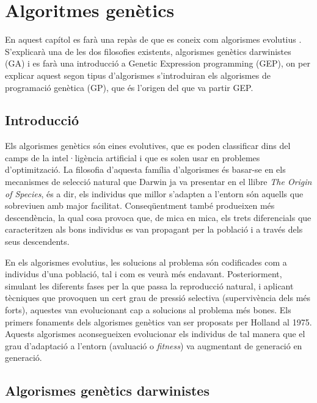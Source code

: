 %

\chapter{Algoritmes genètics}
\label{cha:AG}

En aquest capítol es farà una repàs de que es coneix com algorismes evolutius
\cite{H75}. S'explicarà una de les dos filosofies existents,
algorismes genètics darwinistes (GA) i es farà una introducció a Genetic
Expression programming (GEP), on per explicar aquest segon tipus d'algorismes
s'introduiran els algorismes de programació genètica (GP), que és l'origen del
que va partir GEP.

\section{Introducció}
Els algorismes genètics són eines evolutives, que es poden
classificar dins del camps de la intel·ligència artificial i que es solen usar
en problemes d'optimització. La filosofia d'aquesta família d'algorismes és
basar-se en els mecanismes de selecció natural que Darwin ja va presentar en el
llibre \emph{The Origin of Species}, és a dir, els individus que millor
s'adapten a l'entorn són aquells que sobreviuen amb major facilitat.
Conseqüentment també produeixen més descendència, la qual cosa provoca que, de
mica en mica, els trets diferencials que caracteritzen als bons individus es van
propagant per la població i a través dels seus descendents.

En els algorismes evolutius, les solucions al problema són codificades com a
individus d'una població, tal i com es veurà més endavant.  Posteriorment,
simulant les diferents fases per la que passa la reproducció natural, i aplicant
tècniques que provoquen un cert grau de pressió selectiva (supervivència dels
més forts), aquestes van evolucionant cap a solucions al problema més bones.
Els primers fonaments dels algorismes genètics van ser proposats per Holland \cite{H75} al 1975.
Aquests algorismes aconsegueixen evolucionar els individus de tal manera que el
grau d'adaptació a l'entorn (avaluació o \emph{fitness}) va augmentant de
generació en generació.

\section{Algorismes genètics darwinistes}

